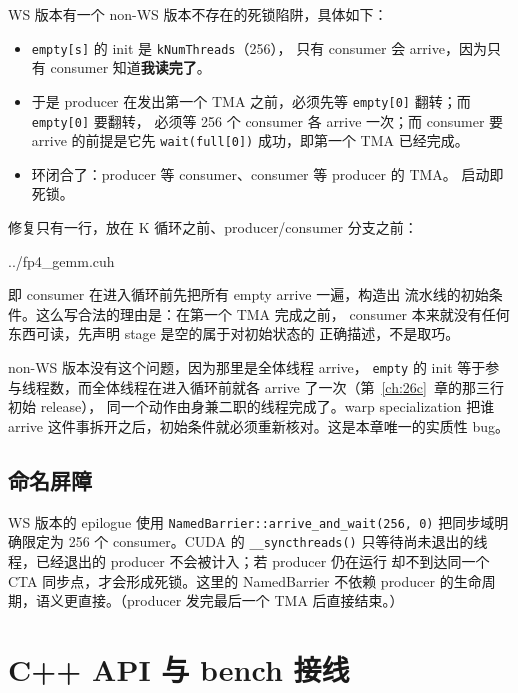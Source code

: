 WS 版本有一个 non-WS 版本不存在的死锁陷阱，具体如下：

\begin{itemize}[itemsep=2pt,topsep=3pt]
  \item \texttt{empty[s]} 的 init 是 \texttt{kNumThreads}（256），
        只有 consumer 会 arrive，因为只有 consumer 知道\textbf{我读完了}。
  \item 于是 producer 在发出第一个 TMA 之前，必须先等
        \texttt{empty[0]} 翻转；而 \texttt{empty[0]} 要翻转，
        必须等 256 个 consumer 各 arrive 一次；而 consumer 要 arrive
        的前提是它先 \texttt{wait(full[0])} 成功，即第一个 TMA
        已经完成。
  \item 环闭合了：producer 等 consumer、consumer 等 producer 的 TMA。
        启动即死锁。
\end{itemize}

修复只有一行，放在 K 循环之前、producer/consumer 分支之前：

\begin{lstinputlisting}[linerange={958-963},firstnumber=auto,
  title={fp4\_gemm.cuh L958-963（WS 的 empty 预置：consumer 先行 arrive）}]{../fp4_gemm.cuh}
\end{lstinputlisting}

即 consumer 在进入循环前先把所有 empty arrive 一遍，构造出
流水线的初始条件。这么写合法的理由是：在第一个 TMA 完成之前，
consumer 本来就没有任何东西可读，先声明 stage 是空的属于对初始状态的
正确描述，不是取巧。

non-WS 版本没有这个问题，因为那里是全体线程 arrive，
\texttt{empty} 的 init 等于参与线程数，而全体线程在进入循环前就各
arrive 了一次（第~\ref{ch:26c}~章的那三行初始 release），
同一个动作由身兼二职的线程完成了。warp specialization 把谁 arrive
这件事拆开之后，初始条件就必须重新核对。这是本章唯一的实质性 bug。

\subsection{命名屏障}

WS 版本的 epilogue 使用 \texttt{NamedBarrier::arrive\_and\_wait(256, 0)}
把同步域明确限定为 256 个 consumer。CUDA 的 \texttt{\_\_syncthreads()}
只等待尚未退出的线程，已经退出的 producer 不会被计入；若 producer 仍在运行
却不到达同一个 CTA 同步点，才会形成死锁。这里的 NamedBarrier 不依赖
producer 的生命周期，语义更直接。（producer 发完最后一个 TMA 后直接结束。）

\section{C++ API 与 bench 接线}\label{sec:37-api}

